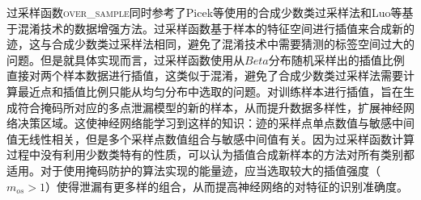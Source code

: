 {	过采样函数\textsc{over\_sample}同时参考了Picek等\citep{Picek19}使用的合成少数类过采样法和Luo等\citep{Luo21}基于混淆技术的数据增强方法。过采样函数基于样本的特征空间进行插值来合成新的迹，这与合成少数类过采样法相同，避免了混淆技术中需要猜测的标签空间过大的问题。但是就具体实现而言，过采样函数使用从$Beta$分布随机采样出的插值比例直接对两个样本数据进行插值，这类似于混淆，避免了合成少数类过采样法需要计算最近点和插值比例只能从均匀分布中选取的问题。对训练样本进行插值，旨在生成符合掩码所对应的多点泄漏模型的新的样本，从而提升数据多样性，扩展神经网络决策区域。这使神经网络能学习到这样的知识：迹的采样点单点数值与敏感中间值无线性相关，但是多个采样点数值组合与敏感中间值有关。因为过采样函数计算过程中没有利用少数类特有的性质，可以认为插值合成新样本的方法对所有类别都适用。对于使用掩码防护的算法实现的能量迹，应当选取较大的插值强度（$m_{os}>1$）使得泄漏有更多样的组合，从而提高神经网络的对特征的识别准确度。
	
}
